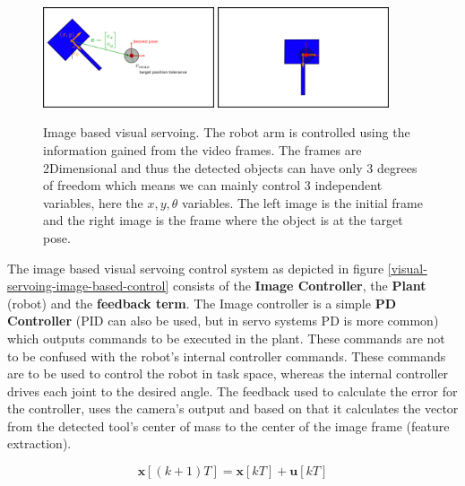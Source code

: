 \begin{center}
\begin{figure}[!htb]
\centering
\includegraphics[width=0.45\textwidth]{images/visual_servo_start.png}
\includegraphics[width=0.45\textwidth]{images/visual_servo_end.png}\\
\caption{Image based visual servoing. The robot arm is controlled using the information gained from the video frames. The frames are 2Dimensional and thus 
the detected objects can have only 3 degrees of freedom which means we can mainly control 3 independent variables, here the $x,y,θ$ variables. The left image 
is the initial frame and the right image is the frame where the object is at the target pose.}
\label{image-based-servoing-start-end}
\end{figure}
\end{center}

The image based visual servoing control system as depicted in figure \ref{visual-servoing-image-based-control} consists of the \textbf{Image Controller}, the \textbf{Plant} (robot) and the \textbf{feedback term}. The Image controller is a simple 
\textbf{PD Controller} (PID can also be used, but in servo systems PD is more common) which outputs commands to be executed in the plant. These commands are not to be confused with the robot's internal controller commands. 
These commands are to be used to control the robot in task space, whereas the internal controller drives each joint to the desired angle. The feedback used to calculate the error for the controller, uses the camera's 
output and based on that it calculates the vector from the detected tool's center of mass to the center of the image frame (feature extraction).

\begin{equation}
\mathbf{x}[(k+1)T] = \mathbf{x}[kT] + \mathbf{u}[kT]
\end{equation}

